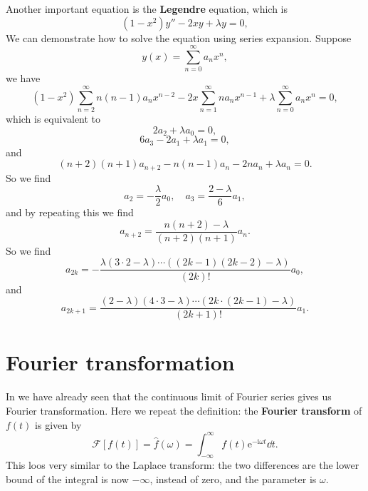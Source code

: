 \documentclass[hyperref, a4paper]{article}
\newcommand*{\ii}{\mathrm{i}}
\newcommand*{\ee}{\mathrm{e}}
\newcommand*{\concept}[1]{{\textbf{#1}}}
\newcommand*{\fourier}{\mathcal{F}}
\begin{document}
Another important equation is the \concept{Legendre} equation, 
which is 
\begin{equation}
    (1 - x^2) y'' - 2 x y + \lambda y = 0,
\end{equation}
We can demonstrate how to solve the equation using series expansion. 
Suppose 
\begin{equation}
    y(x) = \sum_{n=0}^{\infty} a_n x^n,
\end{equation}
we have 
\[
    (1 - x^2) \sum_{n=2}^{\infty} n(n-1) a_n x^{n-2}
    - 2x \sum_{n=1}^{\infty} n a_n x^{n-1}
    + \lambda \sum_{n=0}^{\infty} a_n x^n = 0,
\]
which is equivalent to 
\[
    2 a_2 + \lambda a_0 = 0, 
\]
\[
    6 a_3 - 2 a_1 + \lambda a_1 = 0,
\]
and 
\[
    (n+2)(n+1) a_{n+2} - n(n-1) a_n - 2 n a_n + \lambda a_n = 0.
\]
So we find 
\[
    a_2 = - \frac{\lambda}{2} a_0, \quad   
    a_3 = \frac{2 - \lambda}{6} a_1, 
\]
and by repeating this we find 
\begin{equation}
    a_{n+2} = \frac{
        n(n+2) - \lambda
    }{
        (n + 2) (n + 1)
    } a_n.
\end{equation}
So we find 
\begin{equation}
    a_{2k} = - \frac{
        \lambda (3 \cdot 2 - \lambda) \cdots ((2k-1)(2k-2) - \lambda)
    }{
        (2k)!
    } a_0,
\end{equation}
and 
\begin{equation}
    a_{2k+1} = \frac{
        (2 - \lambda) (4 \cdot 3 - \lambda) \cdots (2k \cdot (2k - 1) - \lambda)
    }{
        (2 k + 1)!
    } a_1.
\end{equation}

\section{Fourier transformation}

In  we have already seen that the continuous limit 
of Fourier series gives us Fourier transformation.
Here we repeat the definition: 
the \concept{Fourier transform} of $f(t)$ is given by 
\begin{equation}
    \fourier [f(t)] = \hat{f}(\omega) = \int_{-\infty}^{\infty} f(t) \ee^{- \ii \omega t} \dd{t}.
\end{equation}
This loos very similar to the Laplace transform: 
the two differences are the lower bound of the integral 
is now $-\infty$, instead of zero, 
and the parameter is $\omega$.
\end{document}
